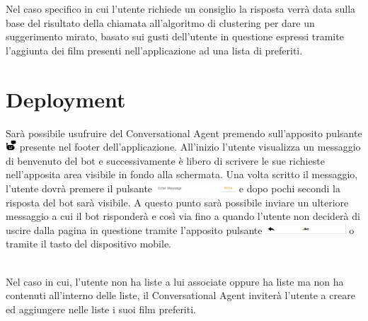 \documentclass[a4paper, 10pt]{report}
\begin{document}
        Nel caso specifico in cui l'utente richiede un consiglio la risposta verrà data sulla base del risultato della chiamata
        all'algoritmo di clustering per dare un suggerimento mirato, basato sui gusti dell'utente in questione espressi tramite
        l'aggiunta dei film presenti nell'applicazione ad una lista di preferiti.


    \chapter{Deployment}\label{ch:deployment}

        Sarà possibile usufruire del Conversational Agent premendo sull'apposito pulsante \includegraphics[width=0.4cm]{deployment/icona_chatbot.png}
        presente nel footer dell'applicazione.
        All'inizio l'utente visualizza un messaggio di benvenuto del bot e successivamente è libero di scrivere le sue
        richieste nell'apposita area visibile in fondo alla schermata. Una volta scritto il messaggio, l'utente dovrà premere il pulsante
        \includegraphics[width=3cm]{deployment/tasto_invia.png} e dopo pochi secondi la risposta del bot sarà visibile.
        A questo punto sarà possibile inviare un ulteriore messaggio a cui il bot risponderà e così via fino a quando l'utente non deciderà
        di uscire dalla pagina in questione tramite l'apposito pulsante \includegraphics[width=3cm]{deployment/tasto_back.png}
        o tramite il tasto  del dispositivo mobile.

        \\Nel caso in cui, l'utente non ha liste a lui associate oppure ha liste ma non
        ha contenuti all'interno delle liste, il Conversational Agent inviterà l'utente a creare ed aggiungere nelle liste i suoi film preferiti.
\end{document}
